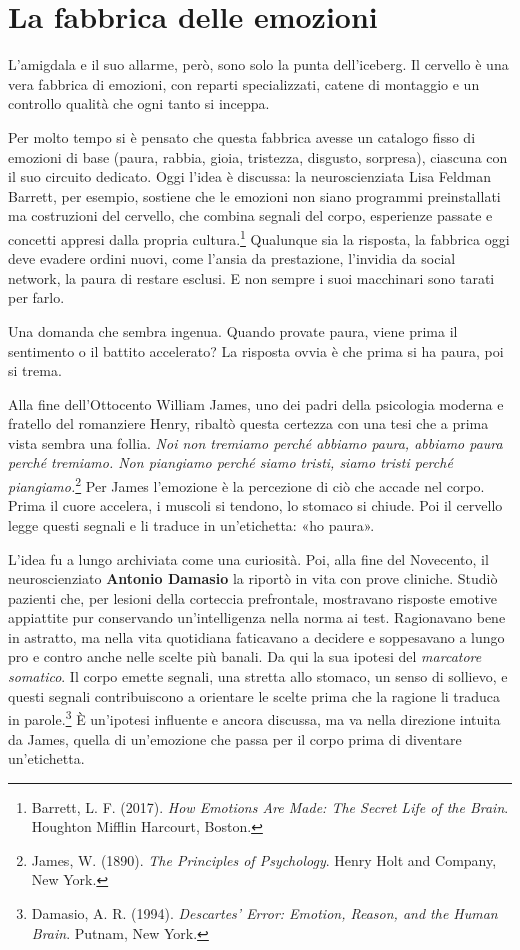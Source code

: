 \section{La fabbrica delle emozioni}

L'amigdala e il suo allarme, però, sono solo la punta dell'iceberg. Il cervello è una vera fabbrica di emozioni, con reparti specializzati, catene di montaggio e un controllo qualità che ogni tanto si inceppa.

Per molto tempo si è pensato che questa fabbrica avesse un catalogo fisso di emozioni di base (paura, rabbia, gioia, tristezza, disgusto, sorpresa), ciascuna con il suo circuito dedicato. Oggi l'idea è discussa: la neuroscienziata Lisa Feldman Barrett, per esempio, sostiene che le emozioni non siano programmi preinstallati ma costruzioni del cervello, che combina segnali del corpo, esperienze passate e concetti appresi dalla propria cultura.\footnote{Barrett, L. F. (2017). \textit{How Emotions Are Made: The Secret Life of the Brain}. Houghton Mifflin Harcourt, Boston.} Qualunque sia la risposta, la fabbrica oggi deve evadere ordini nuovi, come l'ansia da prestazione, l'invidia da social network, la paura di restare esclusi. E non sempre i suoi macchinari sono tarati per farlo.

Una domanda che sembra ingenua. Quando provate paura, viene prima il sentimento o il battito accelerato? La risposta ovvia è che prima si ha paura, poi si trema.

Alla fine dell'Ottocento William James, uno dei padri della psicologia moderna e fratello del romanziere Henry, ribaltò questa certezza con una tesi che a prima vista sembra una follia. \textit{Noi non tremiamo perché abbiamo paura, abbiamo paura perché tremiamo. Non piangiamo perché siamo tristi, siamo tristi perché piangiamo.}\footnote{James, W. (1890). \textit{The Principles of Psychology}. Henry Holt and Company, New York.} Per James l'emozione è la percezione di ciò che accade nel corpo. Prima il cuore accelera, i muscoli si tendono, lo stomaco si chiude. Poi il cervello legge questi segnali e li traduce in un'etichetta: «ho paura».

L'idea fu a lungo archiviata come una curiosità. Poi, alla fine del Novecento, il neuroscienziato \textbf{Antonio Damasio} la riportò in vita con prove cliniche. Studiò pazienti che, per lesioni della corteccia prefrontale, mostravano risposte emotive appiattite pur conservando un'intelligenza nella norma ai test. Ragionavano bene in astratto, ma nella vita quotidiana faticavano a decidere e soppesavano a lungo pro e contro anche nelle scelte più banali. Da qui la sua ipotesi del \textit{marcatore somatico}. Il corpo emette segnali, una stretta allo stomaco, un senso di sollievo, e questi segnali contribuiscono a orientare le scelte prima che la ragione li traduca in parole.\footnote{Damasio, A. R. (1994). \textit{Descartes' Error: Emotion, Reason, and the Human Brain}. Putnam, New York.} È un'ipotesi influente e ancora discussa, ma va nella direzione intuita da James, quella di un'emozione che passa per il corpo prima di diventare un'etichetta.

